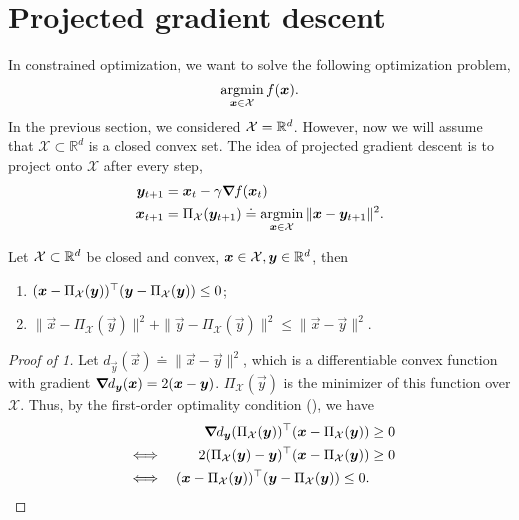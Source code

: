 \section{Projected gradient descent}

In constrained optimization, we want to solve the following optimization problem, \[
    \operatorname*{argmin}_{\bm{x} \in \mathcal{X}} f(\bm{x}).
\]
In the previous section, we considered $\mathcal{X} = \mathbb{R}^d$. However, now we will assume that
$\mathcal{X} \subset \mathbb{R}^d$ is a closed convex set. The idea of projected gradient descent
is to project onto $\mathcal{X}$ after every step,
\begin{align*}
    \bm{y}_{t+1} & = \bm{x}_t - \gamma \bm{\nabla}_{\! } f(\bm{x}_t)                                                                   \\
    \bm{x}_{t+1} & = \Pi_{\mathcal{X}}(\bm{y}_{t+1}) \doteq \operatorname*{argmin}_{\bm{x} \in \mathcal{X}} \| \bm{x} - \bm{y}_{t+1} \|^2.
\end{align*}

\begin{marginfigure}
    \centering
    \caption{Proof by picture of the properties of the projection step made in projected gradient descent.}
    \label{fig:constrained-optimization}
\end{marginfigure}

\begin{lemma}
    \label{lem:proj}

    Let $\mathcal{X} \subset \mathbb{R}^d$ be closed and convex, $\bm{x}\in \mathcal{X}, \bm{y}\in \mathbb{R}^d$,
    then
    \begin{enumerate}
        \item $(\bm{x} - \Pi_{\mathcal{X}}(\bm{y}))^\top (\bm{y} - \Pi_{\mathcal{X}}(\bm{y})) \leq 0$;
        \item $\| \vec{x} - \Pi_{\mathcal{X}}(\vec{y}) \|^2 + \| \vec{y} - \Pi_{\mathcal{X}}(\vec{y}) \|^2 \leq \|\vec{x} - \vec{y}\|^2$.
    \end{enumerate}
\end{lemma}

\begin{proof}[Proof of 1]
    Let $d_{\vec{y}}(\vec{x}) \doteq \| \vec{x} - \vec{y} \|^2$, which is a differentiable convex
    function with gradient $\bm{\nabla}_{\! } d_{\bm{y}}(\bm{x}) = 2(\bm{x} - \bm{y})$. $\Pi_{\mathcal{X}}(\vec{y})$ is the minimizer of this function over $\mathcal{X}$.
    Thus, by the first-order optimality condition (), we have
    \begin{align*}
         &      & \bm{\nabla}_{\! } d_{\bm{y}}(\Pi_{\mathcal{X}}(\bm{y}))^\top (\bm{x} - \Pi_{\mathcal{X}}(\bm{y})) & \geq 0 \\
         & \iff & 2(\Pi_{\mathcal{X}}(\bm{y}) - \bm{y})^\top(\bm{x} - \Pi_{\mathcal{X}}(\bm{y}))           & \geq 0 \\
         & \iff & (\bm{x} - \Pi_{\mathcal{X}}(\bm{y}))^\top(\bm{y} - \Pi_{\mathcal{X}}(\bm{y})) \leq 0.
    \end{align*}
\end{proof}

